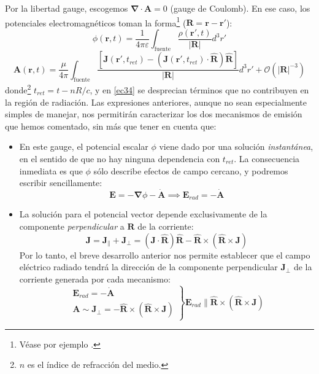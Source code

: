 \documentclass[12 pt, a4paper]{article} %
\numberwithin{equation}{section}
\numberwithin{figure}{section}
\numberwithin{table}{section}
\newcommand{\vect}[1]{\boldsymbol{\mathbf{#1}}}
\begin{document}
Por la libertad gauge, escogemos $\vect{\nabla}\cdot \vect{A}=0$ (gauge de Coulomb). En ese caso, los potenciales electromagnéticos toman la forma\footnote{ Véase por ejemplo \cite{Jackson2002}.} ($\vect{R}=\vect{r}-\vect{r}'$):
\begin{equation}
	\phi(\vect{r}, t)=\frac{1}{4\pi\varepsilon}\int_{\text{fuente}} \frac{\rho(\vect{r}', t)}{\left|\vect{R}\right|}d^3r'\label{ec33}
\end{equation}
\begin{equation}
	\vect{A}\left(\vect{r}, t\right)=\frac{\mu}{4\pi}\int_{\text{fuente}}\frac{\left[\vect{J}\left(\vect{r}', t_{ret}\right)-\left(\vect{J}\left(\vect{r}', t_{ret}\right)\cdot \hat{\vect{R}}\right)\hat{\vect{R}}\right]}{\left|\vect{R}\right|}d^3r'+\mathcal{O}(\left|\vect{R}\right|^{-3})\label{ec34}
\end{equation}
donde\footnote{ $n$ es el índice de refracción del medio.} $t_{ret}=t-nR/c$, y en \eqref{ec34} se desprecian términos que no contribuyen en la región de radiación. Las expresiones anteriores, aunque no sean especialmente simples de manejar, nos permitirán caracterizar los dos mecanismos de emisión que hemos comentado, sin más que tener en cuenta que:
\begin{itemize}
	\item En este gauge, el potencial escalar $\phi$ viene dado por una solución \textit{instantánea}, en el sentido de que no hay ninguna dependencia con $t_{ret}$. La consecuencia inmediata es que $\phi$ sólo describe efectos de campo cercano, y podremos escribir sencillamente:
	\begin{equation}
		\vect{E}=-\vect{\nabla}\phi-\dot{\vect{A}}\implies \vect{E}_{rad} = -\dot{\vect{A}}\label{ec35}
	\end{equation}
\item La solución para el potencial vector depende exclusivamente de la componente \textit{perpendicular} a $\vect{R}$ de la corriente:
\begin{equation}
	\vect{J}=\vect{J}_\parallel+\vect{J}_\perp = \left(\vect{J}\cdot\hat{\vect{R}}\right)\hat{\vect{R}}-\hat{\vect{R}}\times\left(\hat{\vect{R}}\times\vect{J}\right)\label{ec36}
\end{equation} 
Por lo tanto, el breve desarrollo anterior nos permite establecer que el campo eléctrico radiado tendrá la dirección de la componente perpendicular $\vect{J}_\perp$ de la corriente generada por cada mecanismo:
\begin{equation}
	\left.
	\begin{array}{c}
		\vect{E}_{rad} = -\dot{\vect{A}}\\
		\vect{A}\sim\vect{J}_\perp=-\hat{\vect{R}}\times\left(\hat{\vect{R}}\times\vect{J}\right)
	\end{array}
\right\}\vect{E}_{rad}\parallel  \hat{\vect{R}}\times\left(\hat{\vect{R}}\times\vect{J}\right)\label{ec37}
\end{equation}
\end{itemize}
\end{document}
